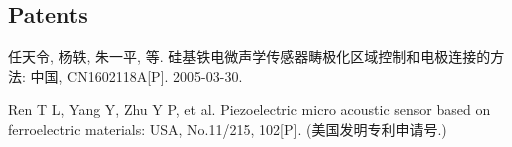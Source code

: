 \begin{resume}
  \subsection{Patents}

  \begin{achievements}
    \item 任天令, 杨轶, 朱一平, 等. 硅基铁电微声学传感器畴极化区域控制和电极连接的方法: 中国, CN1602118A[P]. 2005-03-30.
    \item Ren T L, Yang Y, Zhu Y P, et al. Piezoelectric micro acoustic sensor based on ferroelectric materials: USA, No.11/215, 102[P]. (美国发明专利申请号.)
  \end{achievements}

\end{resume}
